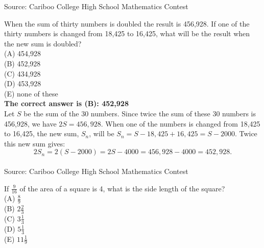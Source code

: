 \documentclass{article}
\begin{document}
\scriptsize
Source: Cariboo College High School Mathematics Contest

\normalsize
When the sum of thirty numbers is doubled the result is 456,928. If one of the thirty numbers is changed from 18,425 to 16,425, what will be the result when the new sum is doubled?\\
(A) 454,928\\
(B) 452,928\\
(C) 434,928\\
(D) 453,928\\
(E) none of these\\


\textbf{The correct answer is (B): 452,928}\\[1 ex]
Let $S$ be the sum of the 30 numbers. Since twice the sum of these 30 numbers is 456,928, we have $2S=456,928$. When one of the numbers is changed from 18,425 to 16,425, the new sum, $S_{n}$, will be $S_{n}=S-18,425+16,425=S-2000$. Twice this new sum gives:
\begin{equation*}
2S_{n}=2(S-2000)=2S-4000=456,928-4000=452,928.
\end{equation*}
\\[5 ex]

\scriptsize
Source: Cariboo College High School Mathematics Contest

\normalsize
If $\frac{9}{16}$ of the area of a square is 4, what is the side length of the square?\\
(A) $\frac{8}{9}$\\[1 ex]
(B) $2\frac{2}{3}$\\[1 ex]
(C) $3\frac{1}{3}$\\[1 ex]
(D) $5\frac{1}{3}$\\[1 ex]
(E) $11\frac{1}{9}$\\
\end{document}
